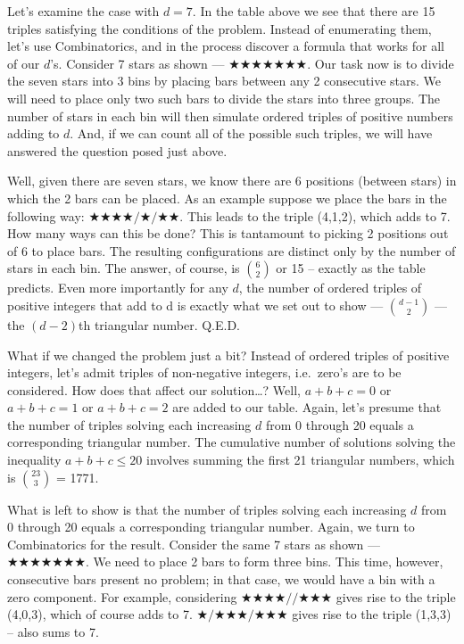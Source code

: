 Let’s examine the case with \(d = 7\). In the table above we see that there are 15 triples satisfying the conditions of the problem. Instead of enumerating them, let’s use Combinatorics, and in the process discover a formula that works for all of our \(d\)’s. Consider 7 stars as shown --- \(\bigstar\bigstar\bigstar\bigstar\bigstar\bigstar\bigstar \). Our task now is to divide the seven stars into 3 bins by placing bars between any 2 consecutive stars. We will need to place only two such bars to divide the stars into three groups. The number of stars in each bin will then simulate ordered triples of positive numbers adding to \(d\). And, if we can count all of the possible such triples, we will have answered the question posed just above.

Well, given there are seven stars, we know there are 6 positions (between stars) in which the 2 bars can be placed. As an example suppose we place the bars in the following way: \(\bigstar\bigstar\bigstar\bigstar/\bigstar/\bigstar\bigstar \). This leads to the triple (4,1,2), which adds to 7. How many ways can this be done? This is tantamount to picking 2 positions out of 6 to place bars. The resulting configurations are distinct only by the number of stars in each bin.  The answer, of course, is \(\binom{6}{2}\) or 15 – exactly as the table predicts. Even more importantly for any \(d\), the number of ordered triples of positive integers that add to d is exactly what we set out to show --- \(\binom{d-1}{2}\) --- the \((d - 2)\)th triangular number. Q.E.D.

What if we changed the problem just a bit? Instead of ordered triples of positive integers, let’s admit triples of non-negative integers, i.e.\ zero’s are to be considered. How does that affect our solution…? Well, \(a + b + c = 0\) or \(a + b + c = 1\) or \(a + b + c = 2\) are added to our table. Again, let’s presume that the number of triples solving each increasing \(d\) from 0 through 20 equals a corresponding triangular number. The cumulative number of solutions solving the inequality \(a + b + c \leq 20\) involves summing the first 21 triangular numbers, which is \(\binom{23}{3}\) = 1771. 

What is left to show is that the number of triples solving each increasing \(d\) from 0 through 20 equals a corresponding triangular number. Again, we turn to Combinatorics for the result. Consider the same 7 stars as shown --- \(\bigstar\bigstar\bigstar\bigstar\bigstar\bigstar\bigstar \). We need to place 2 bars to form three bins. This time, however, consecutive bars present no problem; in that case, we would have a bin with a zero component. For example, considering \(\bigstar\bigstar\bigstar\bigstar//\bigstar\bigstar\bigstar \) gives rise to the triple (4,0,3), which of course adds to 7. \(\bigstar/\bigstar\bigstar\bigstar/\bigstar\bigstar\bigstar \) gives rise to the triple (1,3,3) – also sums to 7.

